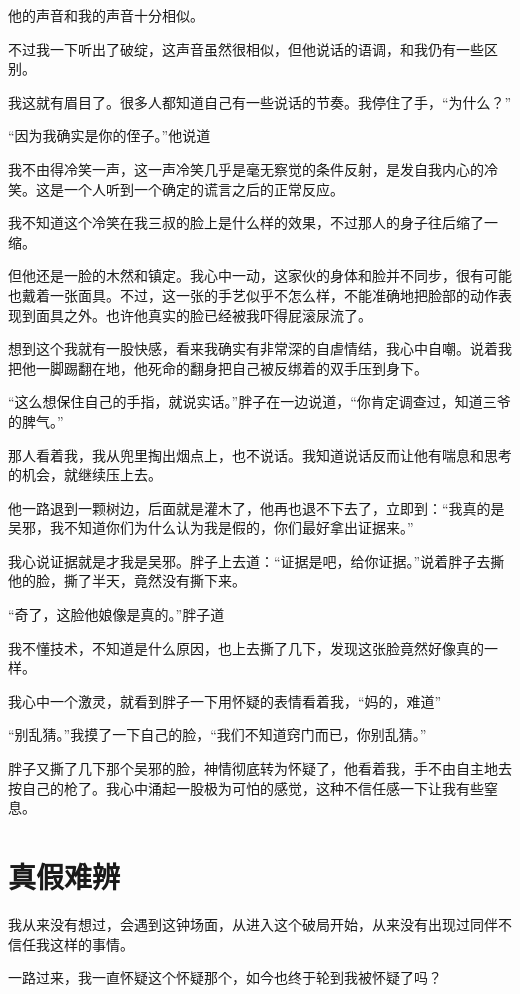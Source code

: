 他的声音和我的声音十分相似。

不过我一下听出了破绽，这声音虽然很相似，但他说话的语调，和我仍有一些区别。

我这就有眉目了。很多人都知道自己有一些说话的节奏。我停住了手，“为什么？”

“因为我确实是你的侄子。”他说道

我不由得冷笑一声，这一声冷笑几乎是毫无察觉的条件反射，是发自我内心的冷笑。这是一个人听到一个确定的谎言之后的正常反应。

我不知道这个冷笑在我三叔的脸上是什么样的效果，不过那人的身子往后缩了一缩。

但他还是一脸的木然和镇定。我心中一动，这家伙的身体和脸并不同步，很有可能也戴着一张面具。不过，这一张的手艺似乎不怎么样，不能准确地把脸部的动作表现到面具之外。也许他真实的脸已经被我吓得屁滚尿流了。

想到这个我就有一股快感，看来我确实有非常深的自虐情结，我心中自嘲。说着我把他一脚踢翻在地，他死命的翻身把自己被反绑着的双手压到身下。

“这么想保住自己的手指，就说实话。”胖子在一边说道，“你肯定调查过，知道三爷的脾气。”

那人看着我，我从兜里掏出烟点上，也不说话。我知道说话反而让他有喘息和思考的机会，就继续压上去。

他一路退到一颗树边，后面就是灌木了，他再也退不下去了，立即到：“我真的是吴邪，我不知道你们为什么认为我是假的，你们最好拿出证据来。”

我心说证据就是才我是吴邪。胖子上去道：“证据是吧，给你证据。”说着胖子去撕他的脸，撕了半天，竟然没有撕下来。

“奇了，这脸他娘像是真的。”胖子道

我不懂技术，不知道是什么原因，也上去撕了几下，发现这张脸竟然好像真的一样。

我心中一个激灵，就看到胖子一下用怀疑的表情看着我，“妈的，难道”

“别乱猜。”我摸了一下自己的脸，“我们不知道窍门而已，你别乱猜。”

胖子又撕了几下那个吴邪的脸，神情彻底转为怀疑了，他看着我，手不由自主地去按自己的枪了。我心中涌起一股极为可怕的感觉，这种不信任感一下让我有些窒息。

\chapter{真假难辨}

我从来没有想过，会遇到这钟场面，从进入这个破局开始，从来没有出现过同伴不信任我这样的事情。

一路过来，我一直怀疑这个怀疑那个，如今也终于轮到我被怀疑了吗？

